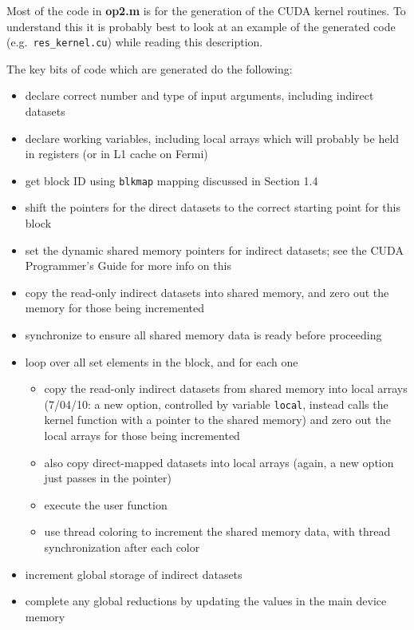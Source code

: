\documentclass[12pt]{article}
\begin{document}
Most of the code in {\bf op2.m} is for the generation of the CUDA 
kernel routines.  To understand this it is probably best to look
at an example of the generated code (e.g.~{\tt res\_kernel.cu})
while reading this description.

The key bits of code which are generated do the following:
\begin{itemize}
\item
declare correct number and type of input arguments, including
indirect datasets

\item
declare working variables, including local arrays which will probably
be held in registers (or in L1 cache on Fermi)

\item
get block ID using {\tt blkmap} mapping discussed in Section 1.4

\item
shift the pointers for the direct datasets to the correct starting 
point for this block

\item
set the dynamic shared memory pointers for indirect datasets; see 
the CUDA Programmer's Guide for more info on this

\item
copy the read-only indirect datasets into shared memory, 
and zero out the memory for those being incremented

\item
synchronize to ensure all shared memory data is ready before proceeding

\item
loop over all set elements in the block, and for each one
 \begin{itemize}
 \item copy the read-only indirect datasets from shared memory 
       into local arrays 
       (7/04/10: a new option, controlled by variable {\tt local},
        instead calls the kernel function with a pointer to the 
        shared memory)
       and zero out the local arrays for those being incremented
 \item also copy direct-mapped datasets into local arrays (again,
       a new option just passes in the pointer)
 \item execute the user function
 \item use thread coloring to increment the shared memory data,
       with thread synchronization after each color
 \end{itemize}

\item
increment global storage of indirect datasets 

\item
complete any global reductions by updating the values in the main device 
memory

\end{itemize}
\end{document}
